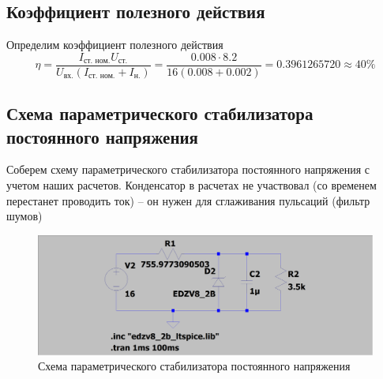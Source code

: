 \documentclass[a4paper, 12pt]{article}
\begin{document}
    \subsection{Коэффициент полезного действия}
    Определим коэффициент полезного действия
    $$
    \eta=\dfrac{I_\text{ст. ном.}U_{\text{ст.}}}{U_{\text{вх.}}\left( I_{\text{ст. ном.}}+I_{\text{н.}} \right)}=\dfrac{0.008\cdot8.2}{16\left( 0.008+0.002 \right)}=0.3961265720\approx40\%
    $$


    \subsection{Схема параметрического стабилизатора постоянного напряжения}
    Соберем схему параметрического стабилизатора постоянного напряжения с учетом наших расчетов.
    Конденсатор в расчетах не участвовал (со временем перестанет проводить ток)
    -- он нужен для сглаживания пульсаций (фильтр шумов)
    \begin{figure}[H]
        \centering
        \includegraphics[scale=0.22]{1task_scheme_AC.png}
        \captionsetup{skip=0pt}
        \caption{Схема параметрического стабилизатора постоянного напряжения}
        \label{fig:1task_scheme_AC}
    \end{figure}
\end{document}
